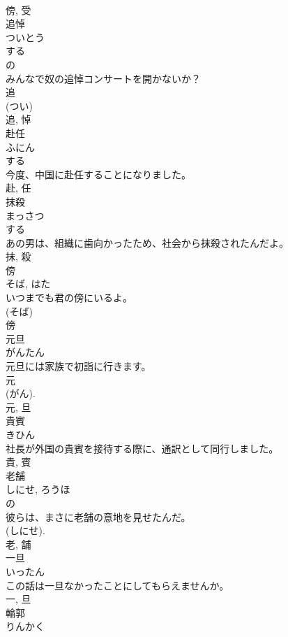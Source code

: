 \documentclass[8pt]{extreport}
\begin{document}
\begin{CJK}{UTF8}{min}
\\	傍, 受	
\\	追悼	
\\	ついとう	
\\	する 
\\	の 
\\	みんなで奴の追悼コンサートを開かないか？	
\\	追 
\\	(つい) 
\\	追, 悼	
\\	赴任	
\\	ふにん	
\\	する 
\\	今度、中国に赴任することになりました。	
\\	赴, 任	
\\	抹殺	
\\	まっさつ	
\\	する 
\\	あの男は、組織に歯向かったため、社会から抹殺されたんだよ。	
\\	抹, 殺	
\\	傍	
\\	そば, はた	
\\	いつまでも君の傍にいるよ。	
\\	(そば) 
\\	傍	
\\	元旦	
\\	がんたん	
\\	元旦には家族で初詣に行きます。	
\\	元 
\\	(がん). 
\\	元, 旦	
\\	貴賓	
\\	きひん	
\\	社長が外国の貴賓を接待する際に、通訳として同行しました。	
\\	貴, 賓	
\\	老舗	
\\	しにせ, ろうほ	
\\	の 
\\	彼らは、まさに老舗の意地を見せたんだ。	
\\	(しにせ). 
\\	老, 舗	
\\	一旦	
\\	いったん	
\\	この話は一旦なかったことにしてもらえませんか。	
\\	一, 旦	
\\	輪郭	
\\	りんかく	

\end{CJK}
\end{document}
